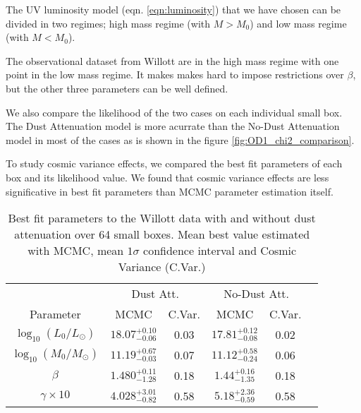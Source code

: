 \documentclass{emulateapj}
\begin{document}
The UV luminosity model (eqn. \ref{eqn:luminosity}) that we have 
chosen can be divided in two regimes; high mass regime 
(with $M > M_0$) and low mass regime (with $M < M_0$).

The observational dataset from Willott are in the high mass regime 
with one point in the low mass regime. It makes makes hard to impose
restrictions over $\beta$, but the other three parameters can be
well defined.

We also compare the likelihood of the two cases on each individual 
small box. The Dust Attenuation model is more acurrate than the
No-Dust Attenuation model in most of the cases as is shown in the figure 
\ref{fig:OD1_chi2_comparison}.

To study cosmic variance effects, we compared the best fit parameters
of each box and its likelihood value. We found that cosmic variance
effects are less significative in best fit parameters than MCMC parameter
estimation itself. 

\begin{table}
\begin{center}
\begin{tabular}{cccccc}\hline\hline
 & \multicolumn{2}{c}{Dust Att.} & \multicolumn{2}{c}{No-Dust Att.}\\
Parameter                  & MCMC                  & C.Var. & MCMC                    & C.Var. \\\hline
$\log_{10}(L_0/L_{\odot})$ & $18.07_{-0.06}^{+0.10}$ & 0.03 & $17.81_{-0.08}^{+0.12}$ & 0.02  \\
$\log_{10}(M_0/M_{\odot})$ & $11.19_{-0.03}^{+0.67}$ & 0.07 & $11.12_{-0.24}^{+0.58}$ & 0.06  \\
$\beta$                    & $1.480_{-1.28}^{+0.11}$ & 0.18 & $ 1.44_{-1.35}^{+0.16}$ & 0.18  \\
$\gamma\times10$           & $4.028_{-0.82}^{+3.01}$ & 0.58 & $ 5.18_{-0.59}^{+2.36}$ & 0.58  \\
\hline\hline
\end{tabular}
\caption{ Best fit parameters to the Willott data with and without 
dust attenuation over 64 small boxes. Mean best value estimated 
with MCMC, mean $1\sigma$ confidence interval and Cosmic Variance
(C.Var.)
} 
\label{table:Willott_best_fit_parameters_no_dust}
\end{center}
\end{table}
\end{document}
